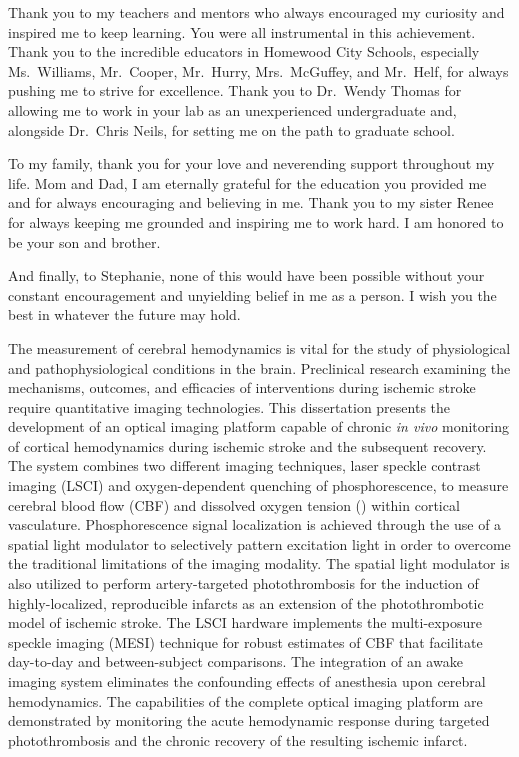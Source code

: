 \documentclass[12pt]{report}
\begin{document}
\begin{acknowledgments}
Thank you to my teachers and mentors who always encouraged my curiosity and inspired me to keep learning. You were all instrumental in this achievement. Thank you to the incredible educators in Homewood City Schools, especially Ms.\ Williams, Mr.\ Cooper, Mr.\ Hurry, Mrs.\ McGuffey, and Mr.\ Helf, for always pushing me to strive for excellence. Thank you to Dr.\ Wendy Thomas for allowing me to work in your lab as an unexperienced undergraduate and, alongside Dr.\ Chris Neils, for setting me on the path to graduate school.

To my family, thank you for your love and neverending support throughout my life. Mom and Dad, I am eternally grateful for the education you provided me and for always encouraging and believing in me. Thank you to my sister Renee for always keeping me grounded and inspiring me to work hard. I am honored to be your son and brother.

And finally, to Stephanie, none of this would have been possible without your constant encouragement and unyielding belief in me as a person. I wish you the best in whatever the future may hold.

\end{acknowledgments}


\utabstract
\indent The measurement of cerebral hemodynamics is vital for the study of physiological and pathophysiological conditions in the brain. Preclinical research examining the mechanisms, outcomes, and efficacies of interventions during ischemic stroke require quantitative imaging technologies. This dissertation presents the development of an optical imaging platform capable of chronic \textit{in vivo} monitoring of cortical hemodynamics during ischemic stroke and the subsequent recovery. The system combines two different imaging techniques, laser speckle contrast imaging (LSCI) and oxygen-dependent quenching of phosphorescence, to measure cerebral blood flow (CBF) and dissolved oxygen tension () within cortical vasculature. Phosphorescence signal localization is achieved through the use of a spatial light modulator to selectively pattern excitation light in order to overcome the traditional limitations of the imaging modality. The spatial light modulator is also utilized to perform artery-targeted photothrombosis for the induction of highly-localized, reproducible infarcts as an extension of the photothrombotic model of ischemic stroke. The LSCI hardware implements the multi-exposure speckle imaging (MESI) technique for robust estimates of CBF that facilitate day-to-day and between-subject comparisons. The integration of an awake imaging system eliminates the confounding effects of anesthesia upon cerebral hemodynamics. The capabilities of the complete optical imaging platform are demonstrated by monitoring the acute hemodynamic response during targeted photothrombosis and the chronic recovery of the resulting ischemic infarct.
\end{document}
